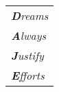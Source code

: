 \begin{dedication}



\vspace*{-10cm} %

\begin{flushright} %
    \begin{tabular}{l} %
        {\Huge \textit{\textbf{D}reams}} \\
        {\Huge \textit{\textbf{A}lways}} \\
        {\Huge \textit{\textbf{J}ustify}} \\
        {\Huge \textit{\textbf{E}fforts}}
    \end{tabular}
\end{flushright}

\end{dedication}



